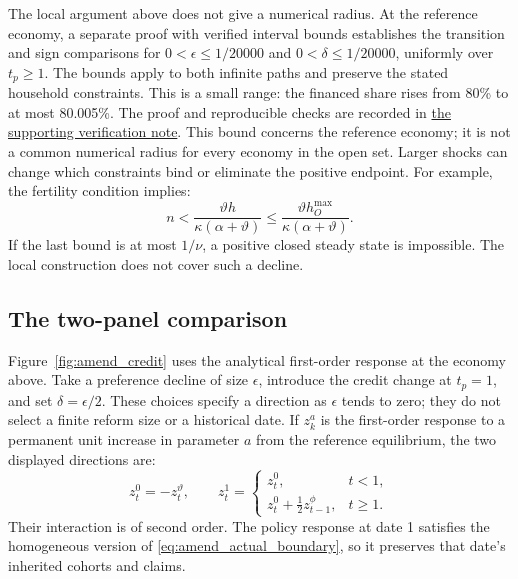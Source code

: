 \documentclass[11pt]{article}
\begin{document}
The local argument above does not give a numerical radius. At the reference
economy, a separate proof with verified interval bounds establishes the
transition and sign comparisons for
$0<\epsilon\leq1/20000$ and $0<\delta\leq1/20000$, uniformly over
$t_p\geq1$. The bounds apply to both infinite paths and preserve the stated
household constraints. This is a small range: the financed share rises from
80\% to at most 80.005\%. The proof and reproducible checks are recorded in
\href{https://github.com/tommasodesanto/Fertility_Spring26/blob/main/output/model/simplified_olg_amendments/oracle_transition_math_assessment.md}{the supporting verification note}.
This bound concerns the reference economy; it is not a common numerical
radius for every economy in the open set. Larger shocks
can change which constraints bind or eliminate the positive endpoint.
For example, the fertility condition implies:
\begin{equation}
 n<\frac{\vartheta h}{\kappa(\alpha+\vartheta)}
 \leq\frac{\vartheta h_O^{\max}}{\kappa(\alpha+\vartheta)}.
 \label{eq:amend_endpoint_obstruction}
\end{equation}
If the last bound is at most $1/\nu$, a positive closed steady state is
impossible. The local construction does not cover such a decline.

\subsection{The two-panel comparison}
\label{app:amend_figure}

Figure~\ref{fig:amend_credit} uses the analytical first-order response at the
economy above. Take a preference decline of size $\epsilon$, introduce the
credit change at $t_p=1$, and set $\delta=\epsilon/2$. These choices specify
a direction as $\epsilon$ tends to zero; they do not select a finite
reform size or a historical date. If $z^a_k$ is the first-order response to
a permanent unit increase in parameter $a$ from the reference equilibrium,
the two displayed directions are:
\begin{equation}
 z_t^0=-z_t^{\vartheta},\qquad
 z_t^1=\begin{cases}
 z_t^0,&t<1,\\
 z_t^0+\tfrac12 z_{t-1}^{\phi},&t\geq1.
 \end{cases}
 \label{eq:amend_figure_paths}
\end{equation}
Their interaction is of second order. The policy response at date 1
satisfies the homogeneous version of \eqref{eq:amend_actual_boundary},
so it preserves that date's inherited cohorts and claims.
\end{document}
